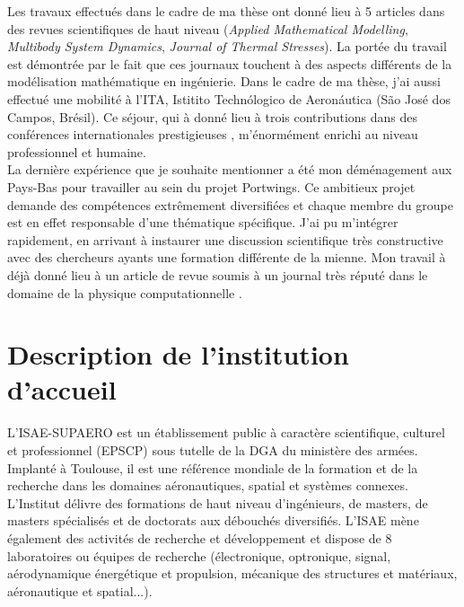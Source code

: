 \documentclass[12pt, french]{article}
\begin{document}
Les travaux effectués dans le cadre de ma thèse ont donné lieu à 5 articles dans des revues scientifiques de haut niveau  (\textit{Applied Mathematical Modelling}, \textit{Multibody System Dynamics}, \textit{Journal of Thermal Stresses}). La portée du travail est démontrée par le fait que ces journaux touchent à des aspects différents de la modélisation mathématique en ingénierie. Dans le cadre de ma thèse, j'ai aussi effectué une  mobilité à l'ITA, Istitito Techn\'ologico de Aeron\'autica (São José dos Campos, Brésil). Ce séjour, qui à donné lieu à trois contributions dans des conférences internationales prestigieuses , m'énormément enrichi au niveau professionnel et humaine. \\

La dernière expérience que je souhaite mentionner a été mon déménagement aux Pays-Bas pour travailler au sein du projet Portwings. Ce ambitieux projet demande des compétences extrêmement diversifiées et chaque membre du groupe est en effet responsable d'une thématique spécifique. J'ai pu m'intégrer rapidement, en arrivant à instaurer une discussion scientifique très constructive avec des chercheurs ayants une formation différente de la mienne. Mon travail à déjà donné lieu à un article de revue soumis à un journal très réputé dans le domaine de la physique computationnelle . 


\section{Description de l'institution d'accueil}

L'ISAE-SUPAERO est un établissement public à caractère scientifique, culturel et professionnel (EPSCP) sous tutelle de la DGA du ministère des armées. Implanté à Toulouse, il est une référence mondiale de la formation et de la recherche dans les domaines aéronautiques, spatial et systèmes connexes. L'Institut délivre des
formations de haut niveau d'ingénieurs, de masters, de masters spécialisés et de doctorats aux débouchés diversifiés. L'ISAE mène également des activités de recherche et développement et dispose de 8 laboratoires ou équipes de recherche (électronique, optronique, signal, aérodynamique énergétique et propulsion,
mécanique des structures et matériaux, aéronautique et spatial...).




\end{document}
